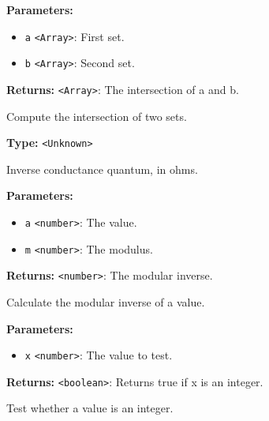 \documentclass[12pt,a4paper]{article}
\begin{document}
\noindent \textbf{Parameters:}
\begin{itemize}
  \item \texttt{a} \texttt{<Array>}: First set.
  \item \texttt{b} \texttt{<Array>}: Second set.
\end{itemize}

\noindent \textbf{Returns:} \texttt{<Array>}: The intersection of a and b.

\noindent Compute the intersection of two sets.

\vspace{5mm}
\noindent {}\vspace{4mm}


\noindent \textbf{Type:} \texttt{<Unknown>}

\noindent Inverse conductance quantum, in ohms.

\vspace{5mm}
\noindent {}


\noindent \textbf{Parameters:}
\begin{itemize}
  \item \texttt{a} \texttt{<number>}: The value.
  \item \texttt{m} \texttt{<number>}: The modulus.
\end{itemize}

\noindent \textbf{Returns:} \texttt{<number>}: The modular inverse.

\noindent Calculate the modular inverse of a value.

\vspace{5mm}
\noindent {}


\noindent \textbf{Parameters:}
\begin{itemize}
  \item \texttt{x} \texttt{<number>}: The value to test.
\end{itemize}

\noindent \textbf{Returns:} \texttt{<boolean>}: Returns true if x is an integer.

\noindent Test whether a value is an integer.

\vspace{5mm}
\noindent {}
\end{document}

